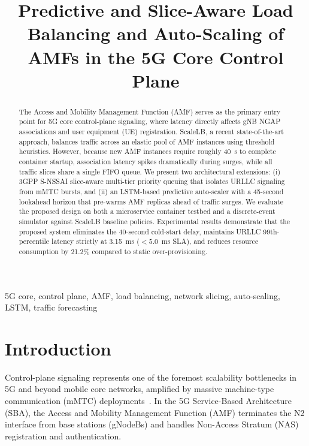 \documentclass[conference]{IEEEtran}
\begin{document}
\title{Predictive and Slice-Aware Load Balancing and Auto-Scaling of AMFs in the 5G Core Control Plane}

\author{
}

\maketitle

\begin{abstract}
The Access and Mobility Management Function (AMF) serves as the primary entry point for 5G core control-plane signaling, where latency directly affects gNB NGAP associations and user equipment (UE) registration. ScaleLB, a recent state-of-the-art approach, balances traffic across an elastic pool of AMF instances using threshold heuristics. However, because new AMF instances require roughly 40~s to complete container startup, association latency spikes dramatically during surges, while all traffic slices share a single FIFO queue. We present two architectural extensions: (i) 3GPP S-NSSAI slice-aware multi-tier priority queuing that isolates URLLC signaling from mMTC bursts, and (ii) an LSTM-based predictive auto-scaler with a 45-second lookahead horizon that pre-warms AMF replicas ahead of traffic surges. We evaluate the proposed design on both a microservice container testbed and a discrete-event simulator against ScaleLB baseline policies. Experimental results demonstrate that the proposed system eliminates the 40-second cold-start delay, maintains URLLC 99th-percentile latency strictly at 3.15~ms ($<5.0$~ms SLA), and reduces resource consumption by 21.2\% compared to static over-provisioning.
\end{abstract}

\begin{IEEEkeywords}
5G core, control plane, AMF, load balancing, network slicing, auto-scaling, LSTM, traffic forecasting
\end{IEEEkeywords}

\section{Introduction}
Control-plane signaling represents one of the foremost scalability bottlenecks in 5G and beyond mobile core networks, amplified by massive machine-type communication (mMTC) deployments~\cite{ts23501}. In the 5G Service-Based Architecture (SBA), the Access and Mobility Management Function (AMF) terminates the N2 interface from base stations (gNodeBs) and handles Non-Access Stratum (NAS) registration and authentication. 
\end{document}
